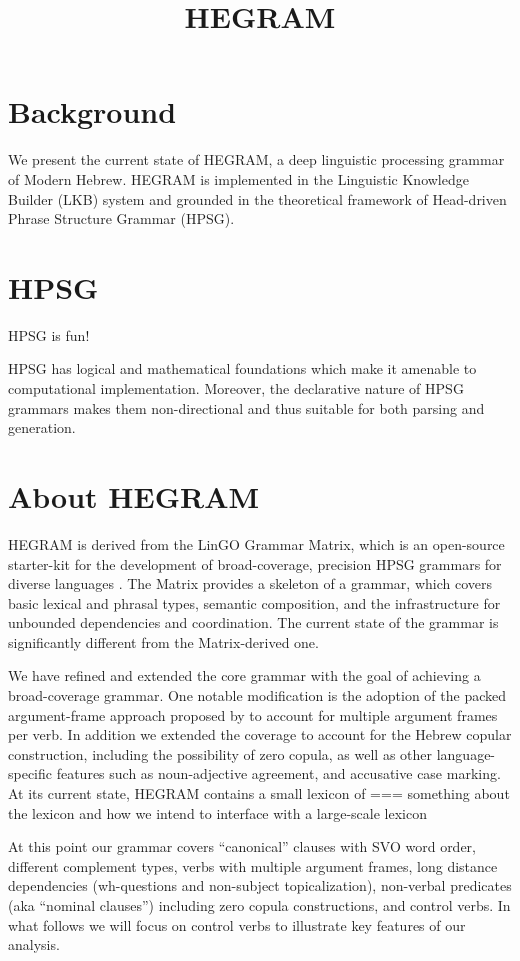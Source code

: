 \documentclass[a4paper]{article}
\title{HEGRAM}
\begin{document}
\section{Background}
We present the current state of HEGRAM, a deep linguistic processing grammar of Modern Hebrew. HEGRAM is implemented in the
Linguistic Knowledge Builder (LKB) system and grounded in the theoretical framework of
Head-driven Phrase Structure Grammar (HPSG).

\section{HPSG}
HPSG is fun!

HPSG has logical and mathematical foundations which make it
amenable to computational implementation. Moreover, the declarative nature of HPSG grammars makes them non-directional and thus suitable for both parsing and generation.

\section{About HEGRAM}

HEGRAM is derived from the LinGO Grammar Matrix, which is an open-source starter-kit for the development of broad-coverage, precision HPSG grammars for diverse languages \citep{BenderFlickingerOepen02}. The Matrix provides a skeleton of a grammar, which covers basic lexical and phrasal types, semantic composition, and the infrastructure for unbounded dependencies and coordination. The current state of the grammar is significantly different from the Matrix-derived one.

We have refined and extended the core grammar with the goal of achieving a broad-coverage grammar. One notable modification is the adoption of the packed argument-frame approach proposed by \citet{Haugereid11} to account for multiple argument frames per verb. In addition we extended the coverage to account for the Hebrew copular construction, including the possibility of zero copula, as well as other language-specific features such as noun-adjective agreement, and accusative case marking. At its current state, HEGRAM contains a small lexicon of
=== something about the lexicon and how we intend to interface with a large-scale lexicon

At this point our grammar covers ``canonical'' clauses with SVO word order, different complement types, verbs with multiple argument frames, long distance dependencies (wh-questions and non-subject topicalization), non-verbal predicates (aka ``nominal clauses'') including zero copula constructions, and control verbs. In what follows we will focus on control verbs to illustrate key features of our analysis.
\end{document}
